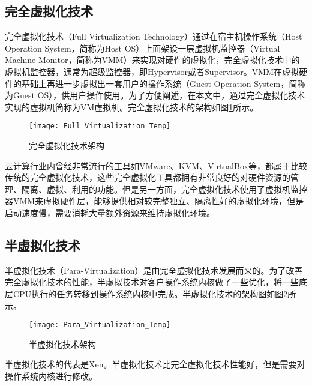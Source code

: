 \subsection{完全虚拟化技术}

完全虚拟化技术（Full Virtualization Technology）通过在宿主机操作系统（Host Operation System，简称为Host OS）上面架设一层虚拟机监控器（Virtual Machine Monitor，简称为VMM）\citep{li2017performance}来实现对硬件的虚拟化，完全虚拟化技术中的虚拟机监控器，通常为超级监控器，即Hypervisor或者Supervisor\citep{kolhe2012comparative}\citep{leite2012performance}。VMM在虚拟硬件的基础上再进一步虚拟出一套用户的操作系统（Guest Operation System，简称为Guest OS），供用户操作使用。为了方便阐述，在本文中，通过完全虚拟化技术实现的虚拟机简称为VM虚拟机。完全虚拟化技术的架构如图\ref{fig:full_virtualization}所示\citep{oludele2014evolution}。

\begin{figure}[!htbp]
    \centering
    \texttt{[image: Full\_Virtualization\_Temp]}
    \caption{完全虚拟化技术架构}
    \label{fig:full_virtualization}
\end{figure}

云计算行业内曾经非常流行的工具如VMware\citep{sahasrabudhe2014comparing,li2010selecting}、KVM\citep{liu2014research}、VirtualBox\citep{li2010selecting}等，都属于比较传统的完全虚拟化技术，这些完全虚拟化工具都拥有非常良好的对硬件资源的管理、隔离、虚拟、利用的功能。但是另一方面，完全虚拟化技术使用了虚拟机监控器VMM来虚拟硬件层，能够提供相对较完整独立、隔离性好的虚拟化环境，但是启动速度慢，需要消耗大量额外资源来维持虚拟化环境。

\subsection{半虚拟化技术}

半虚拟化技术（Para-Virtualization）是由完全虚拟化技术发展而来的。为了改善完全虚拟化技术的性能，半虚拟技术对客户操作系统内核做了一些优化，将一些底层CPU执行的任务转移到操作系统内核中完成。半虚拟化技术的架构图如图\ref{fig:para_virtualization}所示\cite{2008半虚拟化技术分析与研究}。

\begin{figure}[!htbp]
    \centering
    \texttt{[image: Para\_Virtualization\_Temp]}
    \caption{半虚拟化技术架构}
    \label{fig:para_virtualization}
\end{figure}

半虚拟化技术的代表是Xen\cite{barham2003xen}。半虚拟化技术比完全虚拟化技术性能好，但是需要对操作系统内核进行修改。

